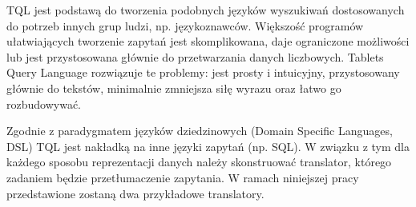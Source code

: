 TQL jest podstawą do tworzenia podobnych języków wyszukiwań dostosowanych do potrzeb innych grup ludzi, np. językoznawców.
Większość programów ułatwiających tworzenie zapytań jest skomplikowana, daje ograniczone możliwości lub jest przystosowana głównie do przetwarzania danych liczbowych. Tablets Query Language rozwiązuje te problemy: jest prosty i intuicyjny, przystosowany głównie do tekstów, minimalnie zmniejsza siłę wyrazu oraz łatwo go rozbudowywać. 

Zgodnie z paradygmatem języków dziedzinowych (Domain Specific Languages, DSL) TQL jest nakładką na inne języki zapytań (np. SQL).
W związku z tym dla każdego sposobu reprezentacji danych należy skonstruować translator, 
którego zadaniem będzie przetłumaczenie zapytania. 
W ramach niniejszej pracy przedstawione zostaną dwa przykładowe translatory.
